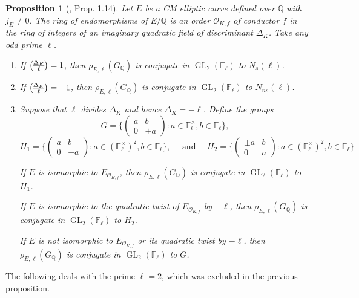 \documentclass[11pt]{amsart}
\newtheorem{prop}[defn]{Proposition}
\theoremstyle{definition}
\newenvironment{romanenum}{\hfill \begin{enumerate} \renewcommand{\theenumi}{\roman{enumi}}}{\end{enumerate}}
\newcommand{\Q}{\mathbb Q}
\newcommand{\QQ}{\mathbb Q}
\newcommand{\FF}{\mathbb F}
\newcommand{\Qbar}{\overline{\mathbb{Q}}}
\newcommand\legendre[2]{{#1\overwithdelims () #2}}
\newcommand{\Of}{\mathcal{O}_{K,f}}
\newcommand{\GL}{\operatorname{GL}}
\begin{document}
\begin{prop}[\cite{zywina}, Prop. 1.14]  \label{prop-zywina1}
Let $E$ be a CM elliptic curve defined over $\QQ$ with $j_E\neq 0$.  The ring of endomorphisms of $E/{\Qbar}$ is an order $\Of$ of conductor $f$ in the ring of integers of an imaginary quadratic field of discriminant $\Delta_K$. Take any odd prime $\ell$.
\begin{romanenum}
\item \label{P:CM main a}
If $\legendre{\Delta_K}{\ell}=1$, then $\rho_{E,\ell}(G_\Q)$ is conjugate in $\GL_2(\FF_\ell)$ to $N_s(\ell)$.
\item \label{P:CM main b}
If $\legendre{\Delta_K}{\ell}=-1$, then $\rho_{E,\ell}(G_\Q)$ is conjugate in $\GL_2(\FF_\ell)$ to $N_{ns}(\ell)$.

\item \label{P:CM main c}
Suppose that $\ell$ divides $\Delta_K$ and hence $\Delta_K = -\ell$.  Define the groups 
\[
G=\{ \left(\begin{smallmatrix} a & b \\0 & \pm a \end{smallmatrix}\right) : a\in \FF_\ell^\times, b\in \FF_\ell\},
\]
\[
H_1 = \{ \left(\begin{smallmatrix} a & b \\0 & \pm a \end{smallmatrix}\right) : a\in (\FF_\ell^\times)^2, b\in \FF_\ell\}, \quad \text{ and }\quad H_2 = \{ \left(\begin{smallmatrix} \pm a & b \\0 &  a \end{smallmatrix}\right) : a\in (\FF_\ell^\times)^2, b\in \FF_\ell\} 
\]

\noindent 
If $E$ is isomorphic to $E_{\Of}$, then $\rho_{E,\ell}(G_\Q)$ is conjugate in $\GL_2(\FF_\ell)$ to $H_1$.

\noindent
If $E$ is isomorphic to the quadratic twist of $E_{\Of}$ by $-\ell$, then $\rho_{E,\ell}(G_\Q)$ is conjugate in $\GL_2(\FF_\ell)$ to $H_2$.

\noindent
If $E$ is not isomorphic to $E_{\Of}$ or its quadratic twist by $-\ell$, then $\rho_{E,\ell}(G_\Q)$ is conjugate in $\GL_2(\FF_\ell)$ to $G$.

\end{romanenum}
\end{prop}

The following deals with the prime $\ell=2$, which was excluded in the previous proposition.
\end{document}
